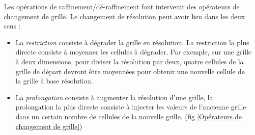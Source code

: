 Les opérations de raffinement/dé-raffinement font intervenir des opérateurs de changement de grille.
Le changement de résolution peut avoir lieu dans les deux sens :

\begin{itemize}
\item La \emph{restriction} consiste à dégrader la grille en résolution. La restriction la plus directe consiste à moyenner les cellules à dégrader. Par exemple, sur une grille à deux dimensions, pour diviser la résolution par deux, quatre cellules de la grille de départ devront être moyennées pour obtenir une nouvelle cellule de la grille à base résolution.

\item La \emph{prolongation} consiste à augmenter la résolution d'une grille, la prolongation la plus directe consiste à injecter les valeurs de l'ancienne grille dans un certain nombre de cellules de la nouvelle grille. (fig \ref{Opérateurs de changement de grille})
\end{itemize}

